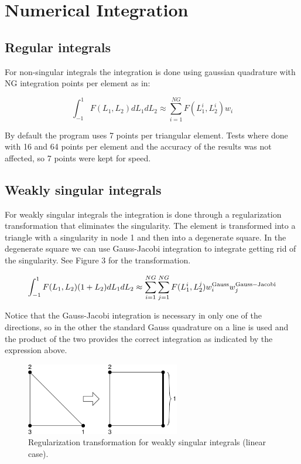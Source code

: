 \documentclass[12pt]{article}
\begin{document}
\pagebreak
\section{Numerical Integration}

\subsection*{Regular integrals}
For non-singular integrals the integration is done using gaussian quadrature with NG integration points per element as in:

\begin{equation}
\int_{-1}^1{F(L_1,L_2)dL_1dL_2} \approx \sum_{i=1}^{NG}{F(L_1^i,L_2^i)w_i}
\end{equation}

By default the program uses 7 points per triangular element. Tests where done with 16 and 64 points per element and the accuracy of the results was not affected, so 7 points were kept for speed.

\subsection*{Weakly singular integrals}
For weakly singular integrals the integration is done through a regularization transformation that eliminates the singularity. The element is transformed into a triangle with a singularity in node 1 and then into a degenerate square. In the degenerate square we can use Gauss-Jacobi integration to integrate getting rid of the singularity. See Figure 3 for the transformation.

\begin{equation}
\int_{-1}^1{F(L_1,L_2)(1+L_2)dL_1dL_2} \approx \sum_{i=1}^{NG}{\sum_{j=1}^{NG}{F(L_1^i,L_2^j)w_i^{\rm Gauss}w_j^{\rm Gauss-Jacobi}}}
\end{equation}

Notice that the Gauss-Jacobi integration is necessary in only one of the directions, so in the other the standard Gauss quadrature on a line is used and the product of the two provides the correct integration as indicated by the expression above.

\begin{figure}[!hbt]
\begin{center}
\includegraphics[width=0.6\textwidth, viewport = 0 0 402 188]{weakly_singular.pdf}
\caption{Regularization transformation for weakly singular integrals (linear case).}
\end{center}
\end{figure}
\end{document}
